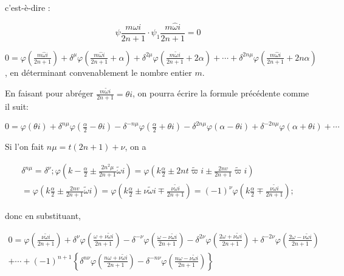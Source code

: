\documentclass{article}
\begin{document}
c'est-è-dire :

\[
\psi \frac{m \hat{\omega} i}{2 n+1} \cdot \psi_{1} \frac{m \hat{\omega} i}{2 n+1}=0
\]

\(0=\varphi\left(\frac{m \hat{\omega} i}{2 n+1}\right)+\delta^{\mu} \varphi\left(\frac{m \hat{\omega} i}{2 n+1}+\alpha\right)+\delta^{2 \mu} \varphi\left(\frac{m \tilde{\omega} i}{2 n+1}+2 \alpha\right)+\cdots+\delta^{2 n \mu} \varphi\left(\frac{m \hat{\omega} i}{2 n+1}+2 n \alpha\right)\), en déterminant convenablement le nombre entier \(m\).

En faisant pour abréger \(\frac{m \tilde{\omega} i}{2 n+1}=\theta i\), on pourra écrire la formule précédente comme il suit:

\(0=\varphi(\theta i)+\delta^{n \mu} \varphi\left(\frac{\alpha}{2}-\theta i\right)-\delta^{-n \mu} \varphi\left(\frac{\alpha}{2}+\theta i\right)-\delta^{2 n \mu} \varphi(\alpha-\theta i)+\delta^{-2 n \mu} \varphi(\alpha+\theta i)+\cdots\)

Si l'on fait \(n \mu=t(2 n+1)+\nu\), on a

\[
\begin{gathered}
\delta^{n \mu}=\delta^{\nu} ; \varphi\left(k-\frac{\alpha}{2} \pm \frac{2 n^{2} \mu}{2 n+1} \widetilde{\omega} i\right)=\varphi\left(k \frac{\alpha}{2} \pm 2 n t \widetilde{\varpi} i \pm \frac{2 n v}{2 n+1} \widetilde{\varpi} i\right) \\
=\varphi\left(k \frac{\alpha}{2} \pm \frac{2 n v}{2 n+1} \widetilde{\omega} i\right)=\varphi\left(k \frac{\alpha}{2} \pm \nu \widetilde{\omega} i \mp \frac{\nu \tilde{\omega} i}{2 n+1}\right)=(-1)^{\nu} \varphi\left(k \frac{\alpha}{2} \mp \frac{\nu \tilde{\omega} i}{2 n+1}\right) ;
\end{gathered}
\]

donc en substituant,

\[
\begin{gathered}
0=\varphi\left(\frac{\nu \tilde{\omega} i}{2 n+1}\right)+\delta^{\nu} \varphi\left(\frac{\omega+\nu \tilde{\omega} i}{2 n+1}\right)-\delta^{-\nu} \varphi\left(\frac{\omega-\nu \tilde{\omega} i}{2 n+1}\right)-\delta^{2 \nu} \varphi\left(\frac{2 \omega+\nu \tilde{\omega} i}{2 n+1}\right)+\delta^{-2 \nu} \varphi\left(\frac{2 \omega-\nu \tilde{\omega} i}{2 n+1}\right) \\
+\cdots+(-1)^{n+1}\left\{\delta^{n \nu} \varphi\left(\frac{n \omega+\nu \tilde{\omega} i}{2 n+1}\right)-\delta^{-n \nu} \varphi\left(\frac{n \omega-\nu \tilde{\omega} i}{2 n+1}\right)\right\}
\end{gathered}
\]
\end{document}
